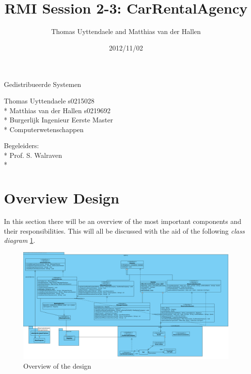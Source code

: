 \documentclass[a4paper]{article}
\title{RMI Session 2-3: CarRentalAgency}
\author{Thomas Uyttendaele and Matthias van der Hallen}
\date{2012/11/02}
\begin{document}
\begin{titlepage}

\pagestyle{plain}

\begin{center}
	{\Large Gedistribueerde Systemen}
	
	\vspace{3cm}

	{\Huge \textbf{\thetitle}}
	
	\vspace{5cm}

	{\Large	Thomas Uyttendaele s0215028 \\* Matthias van der Hallen s0219692\\* Burgerlijk Ingenieur Eerste Master \\* Computerwetenschappen}
\end{center}

\vspace{8cm}

\begin{center}
	{\Large Begeleiders:\\*
	Prof. S. Walraven\\*}
\end{center}

\vspace{2cm}

\begin{center}
	{\Large \thedate}
\end{center}
 
\end{titlepage}
\renewcommand{\contentsname}{Inhoudstafel}
\tableofcontents
\newpage
\section{Overview Design}
In this section there will be an overview of the most important components and their responsibilities. 
This will all be discussed with the aid of the following \emph{class diagram} \ref{fig:classdiagram}. 
\begin{figure}[hbtp]
\centering
\includegraphics[width=\textwidth]{img/RMI 2-3.png}
\caption{Overview of the design}
\label{fig:classdiagram}
\end{figure}
\end{document}
